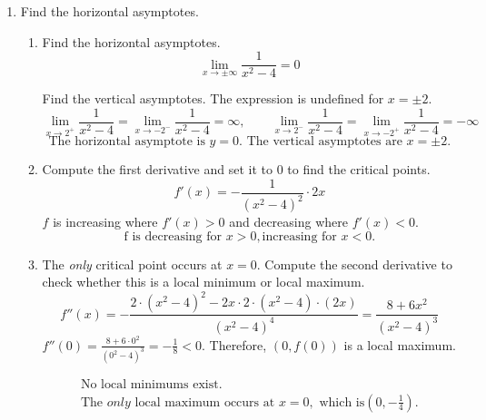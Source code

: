 \documentclass[a4paper, 12pt]{article}
\begin{document}
\begin{enumerate}[leftmargin=*,label=\textbf{\arabic*.}]
\begin{enumerate}[leftmargin=*,label=\textbf{\alph*.}]
\item Compute the first and second derivatives, respectively, applying the chain rule and the quotient rule accordingly.
\begin{equation*}f(x) = \ln\left(\frac{x^2}{x^2+4}\right)\end{equation*}
\begin{equation*}f'(x)= \frac{x^2+4}{x^2}\cdot\frac{2x\cdot(x^2+4)-x^2\cdot2x}{\left(x^2+4\right)^2}=\frac{8}{x^3+4x}\end{equation*}
\begin{equation*}f''(x)= -\frac{8}{\left(x^3+4x\right)^2}\cdot\left(3x^2+4\right)=\boxed{-\frac{24x^2+32}{\left(x^3+4x\right)^2}}\end{equation*}
\end{enumerate}

\item Find the horizontal asymptotes.
\begin{enumerate}[leftmargin=*,label=\textbf{\alph*.}]
\item Find the horizontal asymptotes.
\[\lim_{x\to\pm\infty}\frac{1}{x^2-4}=0\]

Find the vertical asymptotes. The expression is undefined for $x=\pm2$.
\[\lim_{x\to2^+}\frac{1}{x^2-4}=\lim_{x\to-2^-}\frac{1}{x^2-4}=\infty,\qquad \lim_{x\to2^-}\frac{1}{x^2-4}=\lim_{x\to-2^+}\frac{1}{x^2-4}=-\infty\]
\[\boxed{\text{The horizontal asymptote is } y= 0. \text{ The vertical asymptotes are } x=\pm2.}\]

\item Compute the first derivative and set it to $0$ to find the critical points.
\[f'(x)=-\frac{1}{\left(x^2-4\right)^2}\cdot2x\]
$f$ is increasing where $f'(x)>0$ and decreasing where $f'(x)<0$.
\[\boxed{\text{f is decreasing for } x>0, \text{increasing for } x<0.}\]

\item The \textit{only} critical point occurs at $x=0$. Compute the second derivative to check whether this is a local minimum or local maximum.
\begin{equation*}f''(x)=-\frac{2\cdot\left(x^2-4\right)^2-2x\cdot2\cdot(x^2-4)\cdot(2x)}{\left(x^2-4\right)^4}=\frac{8+6x^2}{\left(x^2-4\right)^3}\end{equation*}
$\displaystyle f''(0)=\frac{8+6\cdot0^2}{\left(0^2-4\right)^3}=-\frac18<0$. Therefore, $(0, f(0))$  is a local maximum.

\[
\boxed{
\begin{array}{c}
\displaystyle \text{No local minimums exist.}\\\displaystyle \text{The }\textit{only} \text{ local maximum occurs at } x=0,\text{ which is}\left(0,-\frac14\right).
\end{array}}\]


\end{enumerate}
\end{enumerate}
\end{document}
